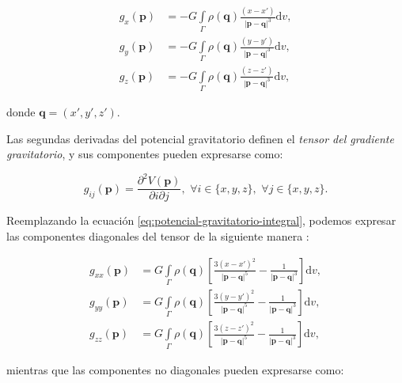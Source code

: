 \begin{align}
    g_x(\mathbf{p}) &=
        - G \int\limits_\Gamma \rho(\mathbf{q})
        \frac{(x - x')}{|\mathbf{p} - \mathbf{q}|^3} \text{d}v,
    \label{eq:gx-integral}
    \\
    g_y(\mathbf{p}) &=
        - G \int\limits_\Gamma \rho(\mathbf{q})
        \frac{(y - y')}{|\mathbf{p} - \mathbf{q}|^3} \text{d}v,
    \label{eq:gy-integral}
    \\
    g_z(\mathbf{p}) &=
        - G \int\limits_\Gamma \rho(\mathbf{q})
        \frac{(z - z')}{|\mathbf{p} - \mathbf{q}|^3} \text{d}v,
    \label{eq:gz-integral}
\end{align}

\noindent donde $\mathbf{q} = (x', y', z')$.

Las segundas derivadas del potencial gravitatorio definen el \emph{tensor del
gradiente gravitatorio}, y sus componentes pueden expresarse como:

\begin{equation}
    g_{ij}(\mathbf{p}) =
        \frac{\partial^2 V(\mathbf{p})}{\partial i \partial j}, \,\,
        \forall i \in \{x, y, z\}, \,\,
        \forall j \in \{x, y, z\}.
\end{equation}

Reemplazando la ecuación \ref{eq:potencial-gravitatorio-integral}, podemos
expresar las componentes diagonales del tensor de la siguiente manera
\citep{grombein2013}:

\begin{align}
    g_{xx}(\mathbf{p}) &=
        G \int\limits_\Gamma \rho(\mathbf{q})
        \left[
        \frac{3(x - x')^2}{|\mathbf{p} - \mathbf{q}|^5}
        - \frac{1}{|\mathbf{p} - \mathbf{q}|^3}
        \right]
        \text{d}v,
    \label{eq:gxx-integral}
    \\
    g_{yy}(\mathbf{p}) &=
        G \int\limits_\Gamma \rho(\mathbf{q})
        \left[
        \frac{3(y - y')^2}{|\mathbf{p} - \mathbf{q}|^5}
        - \frac{1}{|\mathbf{p} - \mathbf{q}|^3}
        \right]
        \text{d}v,
    \label{eq:gyy-integral}
    \\
    g_{zz}(\mathbf{p}) &=
        G \int\limits_\Gamma \rho(\mathbf{q})
        \left[
        \frac{3(z - z')^2}{|\mathbf{p} - \mathbf{q}|^5}
        - \frac{1}{|\mathbf{p} - \mathbf{q}|^3}
        \right]
        \text{d}v,
    \label{eq:gzz-integral}
\end{align}

\noindent mientras que las componentes no diagonales pueden expresarse como:


